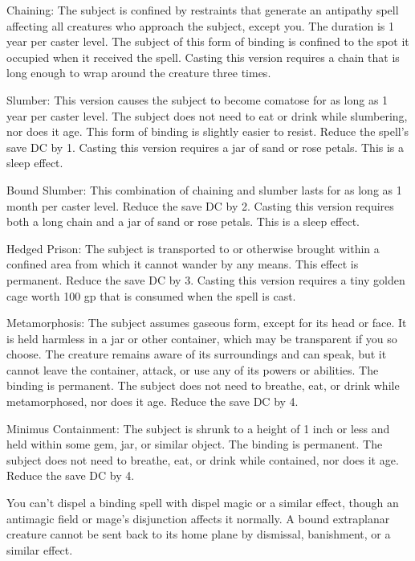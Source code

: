 {Chaining: The subject is confined by restraints that generate an antipathy spell affecting all creatures who approach the subject, except you. The duration is 1 year per caster level. The subject of this form of binding is confined to the spot it occupied when it received the spell. Casting this version requires a chain that is long enough to wrap around the creature three times.

Slumber: This version causes the subject to become comatose for as long as 1 year per caster level. The subject does not need to eat or drink while slumbering, nor does it age. This form of binding is slightly easier to resist. Reduce the spell's save DC by 1. Casting this version requires a jar of sand or rose petals. This is a sleep effect.

Bound Slumber: This combination of chaining and slumber lasts for as long as 1 month per caster level. Reduce the save DC by 2. Casting this version requires both a long chain and a jar of sand or rose petals. This is a sleep effect.

Hedged Prison: The subject is transported to or otherwise brought within a confined area from which it cannot wander by any means. This effect is permanent. Reduce the save DC by 3. Casting this version requires a tiny golden cage worth 100 gp that is consumed when the spell is cast.

Metamorphosis: The subject assumes gaseous form, except for its head or face. It is held harmless in a jar or other container, which may be transparent if you so choose. The creature remains aware of its surroundings and can speak, but it cannot leave the container, attack, or use any of its powers or abilities. The binding is permanent. The subject does not need to breathe, eat, or drink while metamorphosed, nor does it age. Reduce the save DC by 4.

Minimus Containment: The subject is shrunk to a height of 1 inch or less and held within some gem, jar, or similar object. The binding is permanent. The subject does not need to breathe, eat, or drink while contained, nor does it age. Reduce the save DC by 4.

You can't dispel a binding spell with dispel magic or a similar effect, though an antimagic field or mage's disjunction affects it normally. A bound extraplanar creature cannot be sent back to its home plane by dismissal, banishment, or a similar effect.}
        
